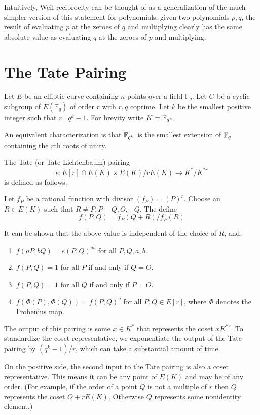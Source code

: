 Intuitively, Weil reciprocity can be thought of as a generalization
of the much simpler version of this statement for polynomials: given
two polynomials $p, q$, the result
of evaluating $p$ at the zeroes of $q$ and multiplying clearly
has the same absolute value as evaluating $q$ at the zeroes of
$p$ and multiplying.

\section {The Tate Pairing }

Let $E$ be an elliptic curve containing $n$ points over a field $\mathbb{F}_q$.
Let $G$ be a cyclic subgroup of $E(\mathbb{F}_q)$ of order $r$ with $r, q$
coprime. Let $k$ be the smallest positive integer such that $r \mid q^k - 1$.
For brevity write $K = \mathbb{F}_{q^k}$.

An equivalent characterization is that
$\mathbb{F}_{q^k}$ is the smallest extension of $\mathbb{F}_q$ containing the $r$th roots of unity.

The Tate (or Tate-Lichtenbaum) pairing
\[
e : E[r] \cap E(K) \times
E(K) / r E(K) \rightarrow
K^* / K^{*r}
\]
is defined as follows.

Let $f_P$ be a rational function with divisor $(f_P) = (P)^r$.
Choose an $R\in E(K)$ such that $R \ne P, P-Q, O, -Q$. The define
\[
f(P, Q) = f_P (Q + R) / f_P (R)
\]

It can be shown that the above value is independent of the choice of $R$,
and:
\begin{enumerate}
\item
$f(a P, b Q) = e(P, Q)^{a b}$ for all $P, Q, a, b$.
\item
$f(P,Q) = 1$ for all $P$ if and only if $Q = O$.
\item
$f(P,Q) = 1$ for all $Q$ if and only if $P = O$.
\item
$f(\Phi(P),\Phi(Q)) = f(P,Q)^{q}$ for all $P,Q \in E[r]$,
where $\Phi$ denotes the Frobenius map.
\end{enumerate}

The output of this pairing is some $x \in K^*$
that represents the coset $x K^{*r}$. To standardize the coset
representative, we exponentiate the output of the Tate pairing
by $(q^k - 1) / r$, which can take a substantial amount of time.

On the positive side, the second input to the Tate pairing is also a coset
representative. This means it can be any point of $E(K)$ and may
be of any order. (For example,
if the order of a point $Q$ is not a multiple of $r$ then $Q$ represents
the coset $O + r E(K)$. Otherwise $Q$ represents some nonidentity
element.)

